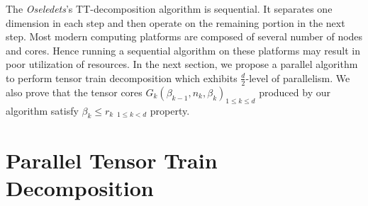 \documentclass[runningheads]{llncs}
\begin{document}
The \textit{Oseledets}'s TT-decomposition algorithm is sequential. It separates one dimension in each step and then operate on the remaining portion in the next step. Most modern computing platforms are composed of several number of nodes and cores. Hence running a sequential algorithm on these platforms may result in poor utilization of resources. In the next section, we propose a parallel algorithm to perform tensor train decomposition which exhibits $\frac{d}{2}$-level of parallelism. We also prove that the tensor cores $G_k(\beta_{k-1}, n_k, \beta_k) _{1\le k\le d}$ produced by our algorithm satisfy $\beta_k \le r_k$ $_{1\le k < d}$ property.
 

\section{Parallel Tensor Train Decomposition}
\label{sec:tt_parallel}
\end{document}
